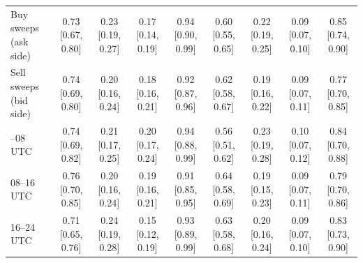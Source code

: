 \begin{tabular}{lcccccccc}
\addlinespace
Buy sweeps (ask side) & 0.73 {\scriptsize[0.67, 0.80]} & 0.23 {\scriptsize[0.19, 0.27]} & 0.17 {\scriptsize[0.14, 0.19]} & 0.94 {\scriptsize[0.90, 0.99]} & 0.60 {\scriptsize[0.55, 0.65]} & 0.22 {\scriptsize[0.19, 0.25]} & 0.09 {\scriptsize[0.07, 0.10]} & 0.85 {\scriptsize[0.74, 0.90]} \\
Sell sweeps (bid side) & 0.74 {\scriptsize[0.69, 0.80]} & 0.20 {\scriptsize[0.16, 0.24]} & 0.18 {\scriptsize[0.16, 0.21]} & 0.92 {\scriptsize[0.87, 0.96]} & 0.62 {\scriptsize[0.58, 0.67]} & 0.19 {\scriptsize[0.16, 0.22]} & 0.09 {\scriptsize[0.07, 0.11]} & 0.77 {\scriptsize[0.70, 0.85]} \\
\addlinespace
00--08 UTC & 0.74 {\scriptsize[0.69, 0.82]} & 0.21 {\scriptsize[0.17, 0.25]} & 0.20 {\scriptsize[0.17, 0.24]} & 0.94 {\scriptsize[0.88, 0.99]} & 0.56 {\scriptsize[0.51, 0.62]} & 0.23 {\scriptsize[0.19, 0.28]} & 0.10 {\scriptsize[0.07, 0.12]} & 0.84 {\scriptsize[0.70, 0.88]} \\
08--16 UTC & 0.76 {\scriptsize[0.70, 0.85]} & 0.20 {\scriptsize[0.16, 0.24]} & 0.19 {\scriptsize[0.16, 0.21]} & 0.91 {\scriptsize[0.85, 0.95]} & 0.64 {\scriptsize[0.58, 0.69]} & 0.19 {\scriptsize[0.15, 0.23]} & 0.09 {\scriptsize[0.07, 0.11]} & 0.79 {\scriptsize[0.70, 0.86]} \\
16--24 UTC & 0.71 {\scriptsize[0.65, 0.76]} & 0.24 {\scriptsize[0.19, 0.28]} & 0.15 {\scriptsize[0.12, 0.19]} & 0.93 {\scriptsize[0.89, 0.99]} & 0.63 {\scriptsize[0.58, 0.68]} & 0.20 {\scriptsize[0.16, 0.24]} & 0.09 {\scriptsize[0.07, 0.10]} & 0.83 {\scriptsize[0.73, 0.90]} \\
\bottomrule
\end{tabular}
